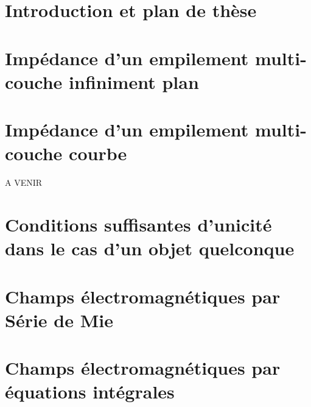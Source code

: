 \documentclass[11pt,%
twoside,%
a4paper,%
openright %
]{book}
\author{\docauthor}
\title{\doctitle}
\begin{document}
\frontmatter


\setcounter{secnumdepth}{5} %
\setcounter{tocdepth}{1}  %
\dominitoc
\clearpage

\mainmatter
\chapter{Introduction et plan de thèse}


\setcounter{mtc}{2} %

\chapter{Impédance d'un empilement multi-couche infiniment plan}
\minitoc



\chapter{Impédance d'un empilement multi-couche courbe}
\minitoc
A VENIR

\chapter{Conditions suffisantes d'unicité dans le cas d'un objet quelconque}
\minitoc




\chapter{Champs électromagnétiques par Série de Mie}
\minitoc





\chapter{Champs électromagnétiques par équations intégrales}
\minitoc


\backmatter
\printbibliography
\end{document}
